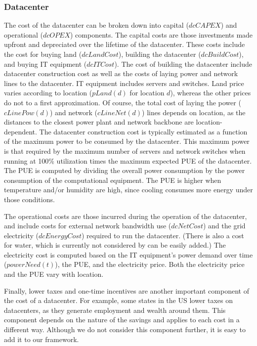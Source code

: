 \subsubsection{Datacenter} The cost of the datacenter can be broken down into capital ($dcCAPEX$) and operational ($dcOPEX$) components.  The capital costs are those investments made upfront and depreciated over the lifetime of the datacenter.  These costs include the cost for buying land ($dcLandCost$), building the datacenter ($dcBuildCost$), and buying IT equipment ($dcITCost$).  The cost of building the datacenter include datacenter construction cost as well as the costs of laying power and network lines to the datacenter.  IT equipment includes servers and switches.  Land price varies according to location ($pLand(d)$ for location $d$), whereas the other prices do not to a first approximation.  Of course, the total cost of laying the power ($cLinePow(d)$) and network ($cLineNet(d)$) lines depends on location, as the distances to the closest power plant and network backbone are location-dependent.  The datacenter construction cost is typically estimated as a function of the maximum power to be consumed by the datacenter.  This maximum power is that required by the maximum number of servers and network switches when running at 100\% utilization times the maximum expected PUE of the datacenter.  The PUE is computed by dividing the overall power consumption by the power consumption of the computational equipment.  The PUE is higher when temperature and/or humidity are high, since cooling consumes more energy under those conditions.

The operational costs are those incurred during the operation of the datacenter, and include costs for external network bandwidth use ($dcNetCost$) and the grid electricity ($dcEnergyCost$) required to run the datacenter.  (There is also a cost for water, which is currently not considered by can be easily added.)  The electricity cost is computed based on the IT equipment's power demand over time ($powerNeed(t)$), the PUE, and the electricity price.  Both the electricity price and the PUE vary with location.

Finally, lower taxes and one-time incentives are another important component of the cost of a datacenter.  For example, some states in the US lower taxes on datacenters, as they generate employment and wealth around them.  This component depends on the nature of the savings and applies to each cost in a different way.  Although we do not consider this component further, it is easy to add it to our framework.

